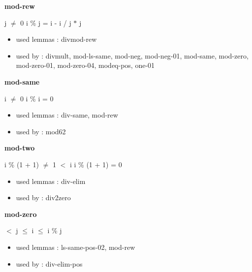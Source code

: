 \documentclass[a4paper]{article}
\begin{document}
\medskip

\bigskip

{\large\bf mod-rew}

\medskip

j $\neq$ 0 \Fol i \% j = i - i / j $*$ j

\begin{itemize}


\item       used lemmas  : divmod-rew
\item       used by      : divmult, mod-ls-same, mod-neg, mod-neg-01, mod-same, mod-zero, mod-zero-01, mod-zero-04, modeq-pos, one-01

\end{itemize}

\medskip

\bigskip

{\large\bf mod-same}

\medskip

i $\neq$ 0 \Fol i \% i = 0

\begin{itemize}


\item       used lemmas  : div-same, mod-rew
\item       used by      : mod62

\end{itemize}

\medskip

\bigskip

{\large\bf mod-two}

\medskip

 \Fol i \% (1 + 1) $\neq$ 1  $<$ i \Imp i \% (1 + 1) = 0

\begin{itemize}


\item       used lemmas  : div-elim
\item       used by      : div2zero

\end{itemize}

\medskip

\bigskip

{\large\bf mod-zero}

\medskip

  $<$ j  $\le$ i  $\le$ i \% j

\begin{itemize}


\item       used lemmas  : ls-same-pos-02, mod-rew
\item       used by      : div-elim-pos

\end{itemize}
\end{document}
